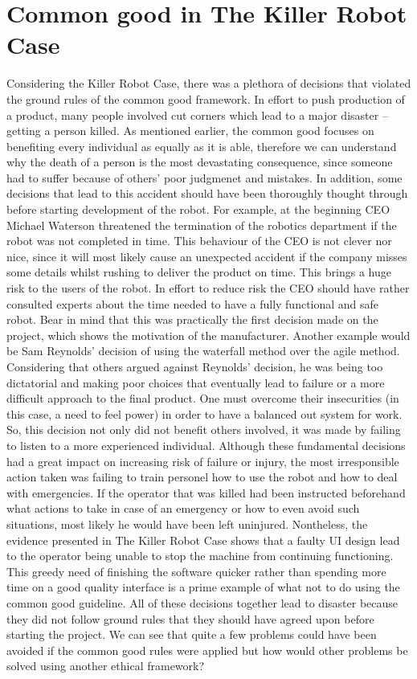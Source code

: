 \documentclass[a4paper]{article}
\begin{document}
\section*{Common good in The Killer Robot Case}
Considering the Killer Robot Case, there was a plethora of decisions that violated the ground rules of the common good framework. In effort to push production of a product, many people involved cut corners which lead to a major disaster – getting a person killed. As mentioned earlier, the common good focuses on benefiting every individual as equally as it is able, therefore we can understand why the death of a person is the most devastating consequence, since someone had to suffer because of others’ poor judgmenet and mistakes. In addition, some decisions that lead to this accident should have been thoroughly thought through before starting development of the robot. For example, at the beginning CEO Michael Waterson threatened the termination of the robotics department if the robot was not completed in time. This behaviour of the CEO is not clever nor nice, since it will most likely cause an unexpected accident if the company misses some details whilst rushing to deliver the product on time. This brings a huge risk to the users of the robot. In effort to reduce risk the CEO should have rather consulted experts about the time needed to have a fully functional and safe robot. Bear in mind that this was practically the first decision made on the project, which shows the motivation of the manufacturer. Another example would be Sam Reynolds’ decision of using the waterfall method over the agile method. Considering that others argued against Reynolds’ decision, he was being too dictatorial and making poor choices that eventually lead to failure or a more difficult approach to the final product. One must overcome their insecurities (in this case, a need to feel power) in order to have a balanced out system for work. So, this decision not only did not benefit others involved, it was made by failing to listen to a more experienced individual. Although these fundamental decisions had a great impact on increasing risk of failure or injury, the most irresponsible action taken was failing to train personel how to use the robot and how to deal with emergencies. If the operator that was killed had been instructed beforehand what actions to take in case of an emergency or how to even avoid such situations, most likely he would have been left uninjured. Nontheless, the evidence presented in The Killer Robot Case shows that a faulty UI design lead to the operator being unable to stop the machine from continuing functioning. This greedy need of finishing the software quicker rather than spending more time on a good quality interface is a prime example of what not to do using the common good guideline.  All of these decisions together lead to disaster because they did not follow ground rules that they should have agreed upon before starting the project. We can see that quite a few problems could have been avoided if the common good rules were applied but how would other problems be solved using another ethical framework?
\end{document}
